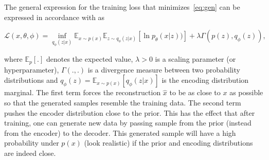 The general expression for the training loss that minimizes~\eqref{eq:gen} can be expressed in accordance with\cite{mescheder2017adversarial,tolstikhin2017wasserstein} as

\begin{equation}
  \mathcal{L}(x,\theta,\phi)=\inf_{q_{\phi}(z|x)}\mathbb{E}_{x\sim p(x)}\mathbb{E}_{z\sim q_{\phi}(z|x)}\left[\ln p_{\theta}(x|z))\right]+\lambda \Gamma(p(z),q_{\phi}(z)),
  \label{eq:WAE_loss}
\end{equation}

where $\mathbb{E}_p \left[ . \right]$ denotes the expected value, $\lambda > 0$ is a scaling parameter (or hyperparameter), $\Gamma(.,.)$ is a divergence measure between two probability distributions and $q_{\phi}(z) = \mathbb{E}_{x\sim p(x)}\left[q_{\phi}(z|x)\right]$ is the encoding distribution marginal. The first term forces the reconstruction $\hat{x}$ to be as close to $x$ as possible so that the generated samples resemble the training data. The second term pushes the encoder distribution close to the prior. This has the effect that after training, one can generate new data by passing sample from the prior (instead from the encoder) to the decoder. This generated sample will have a high probability under $p(x)$ (look realistic) if the prior and encoding distributions are indeed close.

